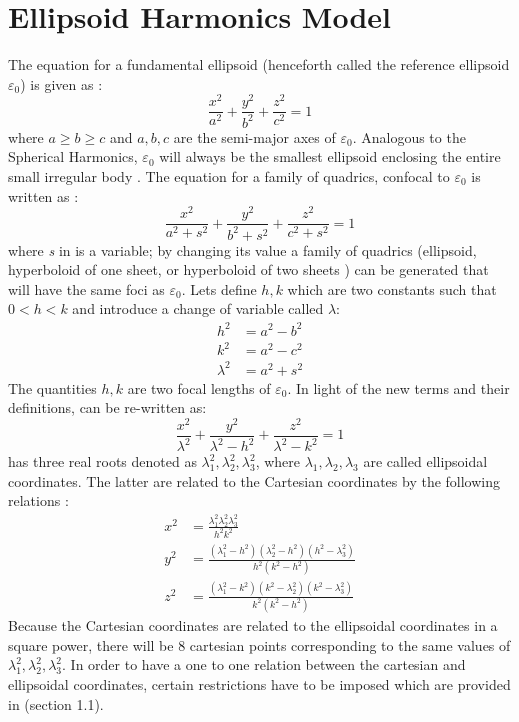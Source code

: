 \section{Ellipsoid Harmonics Model}
\label{ellipse_harmonic}
The equation for a fundamental ellipsoid (henceforth called the reference ellipsoid $\varepsilon_0$) is given as \cite{ellipse_main}:
\begin{equation}
\label{fund_ellipse}
\frac{x^2}{a^2} + \frac{y^2}{b^2} + \frac{z^2}{c^2} = 1
\end{equation}
%
where $a \geq b \geq c$ and $a,b,c$ are the semi-major axes of $\varepsilon_0$. Analogous to the Spherical Harmonics, $\varepsilon_0$ will always be the smallest ellipsoid enclosing the entire small irregular body \cite{ellipse_main}. The equation for a family of quadrics, confocal to $\varepsilon_0$ is written as \cite{ellipse_colorado}:
\begin{equation}
\label{hobson_form}
\frac{x^2}{a^2 + s^2} + \frac{y^2}{b^2 + s^2} + \frac{z^2}{c^2 + s^2} = 1
\end{equation}
%
where \textit{s} in  is a variable; by changing its value a family of quadrics (ellipsoid, hyperboloid of one sheet, or hyperboloid of two sheets \cite{elliptic_integral}) can be generated that will have the same foci as $\varepsilon_0$. Lets define $h, k$ which are two constants such that $0<h<k$ and introduce a change of variable called $\lambda$:
\begin{align}
\label{h_eqn}
h^2 &= a^2 - b^2\\
\label{k_eqn}
k^2 &= a^2 - c^2\\
\label{lambda_general}
\lambda^2 &= a^2 + s^2
\end{align}
%
The quantities $h,k$ are two focal lengths of $\varepsilon_0$. In light of the new terms and their definitions,  can be re-written as:
\begin{equation}
\label{quadric_family}
\frac{x^2}{\lambda^2} + \frac{y^2}{\lambda^2 - h^2} + \frac{z^2}{\lambda^2 - k^2} = 1
\end{equation}
%
 has three real roots denoted as $\lambda_1^2, \lambda_2^2, \lambda_3^2$, where $\lambda_1, \lambda_2, \lambda_3$ are called ellipsoidal coordinates. The latter are related to the Cartesian coordinates by the following relations \cite{ellipse_colorado}:
\begin{align}
\label{cart2ellip_x}
x^2 &= \frac{\lambda_1^2 \lambda_2^2 \lambda_3^2}{h^2k^2}\\
\label{cart2ellip_y}
y^2 &= \frac{(\lambda_1^2 - h^2)(\lambda_2^2 - h^2)(h^2 - \lambda_3^2)}{h^2(k^2-h^2)}\\
\label{cart2ellip_z}
z^2 &= \frac{(\lambda_1^2 - k^2)(k^2 - \lambda_2^2)(k^2 - \lambda_3^2)}{k^2(k^2 - h^2)}
\end{align}
%
Because the Cartesian coordinates are related to the ellipsoidal coordinates in a square power, there will be 8 cartesian points corresponding to the same values of $\lambda_1^2, \lambda_2^2, \lambda_3^2$. In order to have a one to one relation between the cartesian and ellipsoidal coordinates, certain restrictions have to be imposed which are provided in \cite{ellipse_colorado} (section 1.1).

